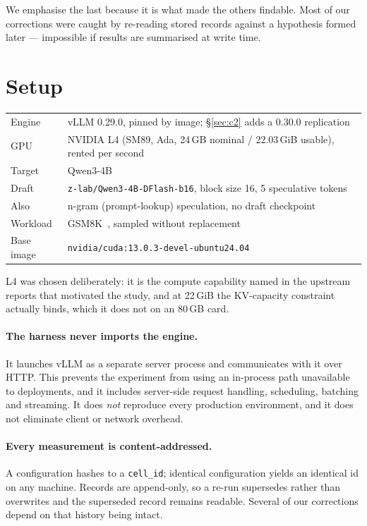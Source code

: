 \documentclass[11pt]{article}
\newcommand{\tw}[1]{\texttt{\small #1}}
\begin{document}
We emphasise the last because it is what made the others findable. Most of
our corrections were caught by re-reading stored records against a
hypothesis formed later --- impossible if results are summarised at write
time.

\section{Setup}\label{sec:setup}

\begin{table}[h]\centering\small
\begin{tabular}{ll}
\toprule
Engine & vLLM 0.29.0, pinned by image; \S\ref{sec:c2} adds a 0.30.0 replication\\
GPU & NVIDIA L4 (SM89, Ada, 24\,GB nominal / 22.03\,GiB usable), rented per second\\
Target & Qwen3-4B\\
Draft & \tw{z-lab/Qwen3-4B-DFlash-b16}, block size 16, 5 speculative tokens\\
Also & n-gram (prompt-lookup) speculation, no draft checkpoint\\
Workload & GSM8K~\cite{cobbe2021}, sampled without replacement\\
Base image & \tw{nvidia/cuda:13.0.3-devel-ubuntu24.04}\\
\bottomrule
\end{tabular}
\end{table}

\noindent
L4 was chosen deliberately: it is the compute capability named in the
upstream reports that motivated the study, and at 22\,GiB the KV-capacity
constraint actually binds, which it does not on an 80\,GB card.

\paragraph{The harness never imports the engine.} It launches vLLM as a
separate server process and communicates with it over HTTP. This prevents
the experiment from using an in-process path unavailable to deployments, and
it includes server-side request handling, scheduling, batching and
streaming. It does \emph{not} reproduce every production environment, and it
does not eliminate client or network overhead.

\paragraph{Every measurement is content-addressed.} A configuration hashes
to a \tw{cell\_id}; identical configuration yields an identical id on any
machine. Records are append-only, so a re-run supersedes rather than
overwrites and the superseded record remains readable. Several of our
corrections depend on that history being intact.
\end{document}
